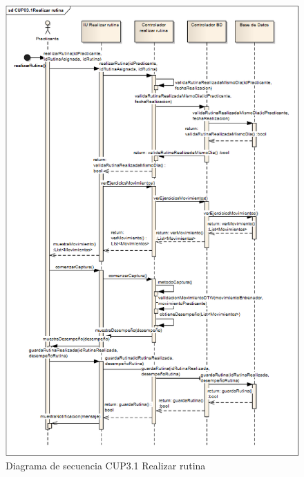 \begin{figure}[H]
	\begin{center}
		\includegraphics[scale=0.5]{./Figuras/Secuencias/CUP03_1Realizar_rutina}
	\end{center}
	\caption{Diagrama de secuencia CUP3.1 Realizar rutina}
	\label{fig:SE_CUP031}
\end{figure}

